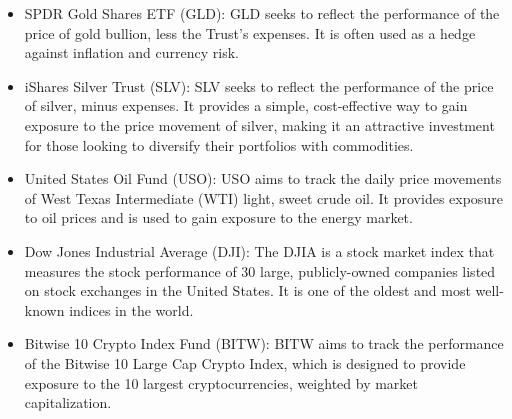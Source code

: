 \begin{itemize}
    \item SPDR Gold Shares ETF (GLD): GLD seeks to reflect the performance of the price of gold bullion, less the Trust’s expenses. It is often used as a hedge against inflation and currency risk.
    \item iShares Silver Trust (SLV): SLV seeks to reflect the performance of the price of silver, minus expenses. It provides a simple, cost-effective way to gain exposure to the price movement of silver, making it an attractive investment for those looking to diversify their portfolios with commodities.
    \item United States Oil Fund (USO): USO aims to track the daily price movements of West Texas Intermediate (WTI) light, sweet crude oil. It provides exposure to oil prices and is used to gain exposure to the energy market.
    \item Dow Jones Industrial Average (DJI): The DJIA is a stock market index that measures the stock performance of 30 large, publicly-owned companies listed on stock exchanges in the United States. It is one of the oldest and most well-known indices in the world.
    \item Bitwise 10 Crypto Index Fund (BITW): BITW aims to track the performance of the Bitwise 10 Large Cap Crypto Index, which is designed to provide exposure to the 10 largest cryptocurrencies, weighted by market capitalization.
\end{itemize}





